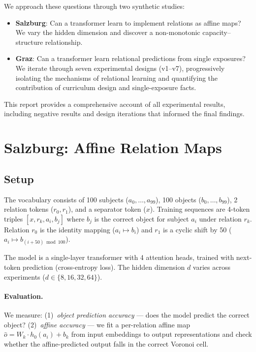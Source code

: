 \documentclass[11pt]{article}
\begin{document}
We approach these questions through two synthetic studies:

\begin{itemize}
\item \textbf{Salzburg}: Can a transformer learn to implement relations as affine maps?
  We vary the hidden dimension and discover a non-monotonic capacity--structure
  relationship.
\item \textbf{Graz}: Can a transformer learn relational predictions from single
  exposures? We iterate through seven experimental designs (v1--v7), progressively
  isolating the mechanisms of relational learning and quantifying the contribution of
  curriculum design and single-exposure facts.
\end{itemize}

This report provides a comprehensive account of all experimental results, including
negative results and design iterations that informed the final findings.

\section{Salzburg: Affine Relation Maps}
\label{sec:salzburg}

\subsection{Setup}

The vocabulary consists of 100 subjects ($a_0, \ldots, a_{99}$), 100 objects
($b_0, \ldots, b_{99}$), 2 relation tokens ($r_0, r_1$), and a separator token ($x$).
Training sequences are 4-token triples $[x, r_k, a_i, b_j]$ where $b_j$ is the correct
object for subject $a_i$ under relation $r_k$.  Relation $r_0$ is the identity mapping
($a_i \mapsto b_i$) and $r_1$ is a cyclic shift by 50 ($a_i \mapsto b_{(i+50) \bmod 100}$).

The model is a single-layer transformer with 4 attention heads, trained with
next-token prediction (cross-entropy loss).  The hidden dimension $d$ varies
across experiments ($d \in \{8, 16, 32, 64\}$).

\paragraph{Evaluation.}
We measure: (1)~\emph{object prediction accuracy} --- does the model predict the
correct object? (2)~\emph{affine accuracy} --- we fit a per-relation affine map
$\hat{o} = W_k \cdot h_0(a_i) + b_k$ from input embeddings to output representations
and check whether the affine-predicted output falls in the correct Voronoi cell.
\end{document}
